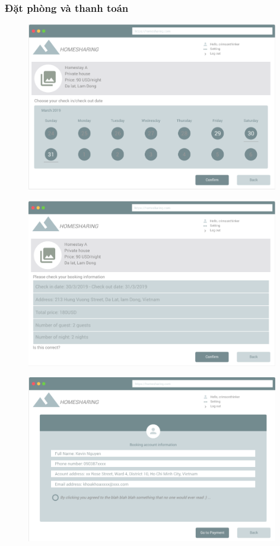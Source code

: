 \subsubsection{Đặt phòng và thanh toán}
\begin{figure}[H]
	\centering
	\includegraphics[width=11cm]{parts/Khoa/khoa_ui/2.png}
\end{figure}
\begin{figure}[H]
	\centering
	\includegraphics[width=11cm]{parts/Khoa/khoa_ui/3.png}
\end{figure}
\newpage 
\begin{figure}[H]
	\centering
	\includegraphics[width=11cm]{parts/Khoa/khoa_ui/4.png}
\end{figure}
